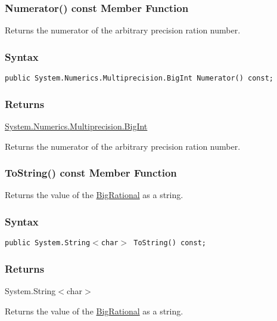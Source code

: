 \documentclass[a4paper,oneside,11.000000pt]{book}
\begin{document}
\hypertarget{System.Numerics.Multiprecision.BigRational.Numerator.C.P.System.Numerics.Multiprecision.BigRational}{\subsubsection*{Numerator() const Member Function}}
\begin{flushleft}
Returns the numerator of the arbitrary precision ration number.

\end{flushleft}
\subsubsection*{Syntax}
\texttt{public System.Numerics.Multiprecision.BigInt Numerator() const;}
\subsubsection*{Returns}
\hyperlink{System.Numerics.Multiprecision.BigInt}{System.\-Numerics.\-Multiprecision.\-BigInt}
\begin{flushleft}
Returns the numerator of the arbitrary precision ration number.

\end{flushleft}
\clearpage

\hypertarget{System.Numerics.Multiprecision.BigRational.ToString.C.P.System.Numerics.Multiprecision.BigRational}{\subsubsection*{ToString() const Member Function}}
\begin{flushleft}
Returns the value of the \hyperlink{System.Numerics.Multiprecision.BigRational}{BigRational} as a string.

\end{flushleft}
\subsubsection*{Syntax}
\texttt{public System.String$<$char$>$ ToString() const;}
\subsubsection*{Returns}System.\-String$<$\-char$>$\-
\begin{flushleft}
Returns the value of the \hyperlink{System.Numerics.Multiprecision.BigRational}{BigRational} as a string.

\end{flushleft}
\clearpage
\end{document}
